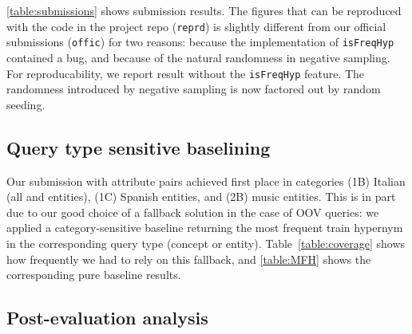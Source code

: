 \documentclass[11pt,a4paper]{article}
\begin{document}
\autoref{table:submissions} shows submission results.
The figures that can be reproduced with the code in the project repo
(\texttt{reprd}) is slightly different from our official submissions
(\texttt{offic}) for two reasons:
because the implementation of \texttt{isFreqHyp} contained a bug, and because
of the natural randomness in negative sampling.
For reproducability, we report result without the \texttt{isFreqHyp} feature.
The randomness introduced by negative sampling is now factored out by random
seeding.






\subsection{Query type sensitive baselining}

Our submission with attribute pairs achieved first place in 
categories
  {(1B) Italian} ({all} and {entities}),
  {(1C) Spanish entities}, and
  {(2B) music entities}.
This is in part due to our good choice of a fallback solution
in the case of OOV queries: we applied a category-sensitive baseline returning
the most frequent train hypernym in the corresponding query type (concept or
entity).  Table~\ref{table:coverage} shows how frequently we had to rely on
this fallback, and \autoref{table:MFH} shows the corresponding pure baseline
results.



\subsection{Post-evaluation analysis}
\end{document}
